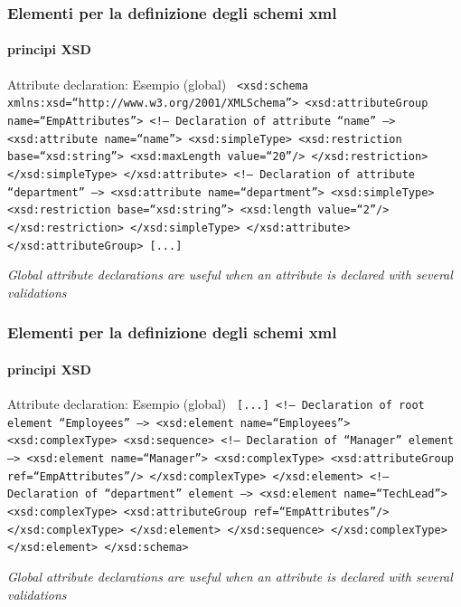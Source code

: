 \begin{frame}
	\frametitle{Elementi per la definizione degli schemi xml}
	\framesubtitle{principi XSD}
	\addtocounter{nframe}{1}

	\begin{block}{Attribute declaration: Esempio (global)}
		\texttt{
			<xsd:schema xmlns:xsd=``http://www.w3.org/2001/XMLSchema''>
			<xsd:attributeGroup name=``EmpAttributes''>
			<!-- Declaration of attribute ``name'' -->
			<xsd:attribute name=``name''>
			<xsd:simpleType>
			<xsd:restriction base=``xsd:string''>
			<xsd:maxLength value=``20''/>
			</xsd:restriction>
			</xsd:simpleType>
			</xsd:attribute>
			<!-- Declaration of attribute ``department'' -->
			<xsd:attribute name=``department''>
			<xsd:simpleType>
			<xsd:restriction base=``xsd:string''>
			<xsd:length value=``2''/>
			</xsd:restriction>
			</xsd:simpleType>
			</xsd:attribute>
			</xsd:attributeGroup>
			[...]
		}
	\end{block}

	\textit{Global attribute declarations are useful when an attribute is declared with several validations}


\end{frame}


\begin{frame}
	\frametitle{Elementi per la definizione degli schemi xml}
	\framesubtitle{principi XSD}
	\addtocounter{nframe}{1}

	\begin{block}{Attribute declaration: Esempio (global)}
		\texttt{
			[...]
			<!-- Declaration of root element ``Employees'' -->
			<xsd:element name=``Employees''>
			<xsd:complexType>
			<xsd:sequence>
			<!-- Declaration of ``Manager'' element -->
			<xsd:element name=``Manager''>
			<xsd:complexType>
			<xsd:attributeGroup ref=``EmpAttributes''/>
			</xsd:complexType>
			</xsd:element>
			<!-- Declaration of ``department'' element -->
			<xsd:element name=``TechLead''>
			<xsd:complexType>
			<xsd:attributeGroup ref=``EmpAttributes''/>
			</xsd:complexType>
			</xsd:element>
			</xsd:sequence>
			</xsd:complexType>
			</xsd:element>
			</xsd:schema>
		}
	\end{block}

	\textit{Global attribute declarations are useful when an attribute is declared with several validations}


\end{frame}





